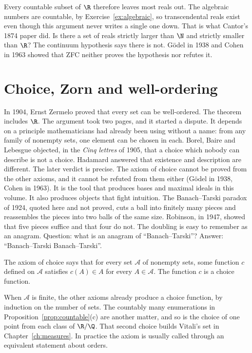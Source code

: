 Every countable subset of $\R$ therefore leaves most reals out. The algebraic numbers are countable, by Exercise~\ref{ex:algebraic}, so transcendental reals exist even though this argument never writes a single one down. That is what Cantor's 1874 paper did. Is there a set of reals strictly larger than $\N$ and strictly smaller than $\R$? The continuum hypothesis says there is not. G\"odel in 1938 and Cohen in 1963 showed that ZFC neither proves the hypothesis nor refutes it.

\section{Choice, Zorn and well-ordering}\label{sec:choice}

In 1904, Ernst Zermelo proved that every set can be well-ordered. The theorem includes $\R$. The argument took two pages, and it started a dispute. It depends on a principle mathematicians had already been using without a name: from any family of nonempty sets, one element can be chosen in each. Borel, Baire and Lebesgue objected, in the \emph{Cinq lettres} of 1905, that a choice which nobody can describe is not a choice. Hadamard answered that existence and description are different. The later verdict is precise. The axiom of choice cannot be proved from the other axioms, and it cannot be refuted from them either (G\"odel in 1938, Cohen in 1963). It is the tool that produces bases and maximal ideals in this volume. It also produces objects that fight intuition. The Banach--Tarski paradox of 1924, quoted here and not proved, cuts a ball into finitely many pieces and reassembles the pieces into two balls of the same size. Robinson, in 1947, showed that five pieces suffice and that four do not. The doubling is easy to remember as an anagram. Question: what is an anagram of ``Banach--Tarski''? Answer: ``Banach--Tarski Banach--Tarski''.

\begin{definition}
The axiom of choice says that for every set $\mathcal A$ of nonempty sets, some function $c$ defined on $\mathcal A$ satisfies $c(A)\in A$ for every $A\in\mathcal A$. The function $c$ is a choice function.
\end{definition}

When $\mathcal A$ is finite, the other axioms already produce a choice function, by induction on the number of sets. The countably many enumerations in Proposition~\ref{prop:countable}(c) are another matter, and so is the choice of one point from each class of $\R/\Q$. That second choice builds Vitali's set in Chapter~\ref{ch:measures}. In practice the axiom is usually called through an equivalent statement about orders.

